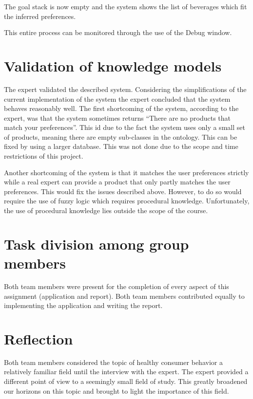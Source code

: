\documentclass[11pt,a4paper]{article}
\begin{document}
The goal stack is now empty and the system shows the list of beverages which fit the inferred preferences.

This entire process can be monitored through the use of the Debug window.

\section{Validation of knowledge models} 

The expert validated the described system. Considering the simplifications of the current implementation of the system the expert concluded that the system behaves reasonably well. The first shortcoming of the system, according to the expert, was that the system sometimes returns ``There are no products that match your preferences''. This id due to the fact the system uses only a small set of products, meaning there are empty sub-classes in the ontology. This can be fixed by using a larger database. This was not done due to the scope and time restrictions of this project.

Another shortcoming of the system is that it matches the user preferences strictly while a real expert can provide a product that only partly matches the user preferences. This would fix the issues described above. However, to do so would require the use of fuzzy logic which requires procedural knowledge. Unfortunately, the use of procedural knowledge lies outside the scope of the course. 

\section{Task division among group members}

Both team members were present for the completion of every aspect of this assignment (application and report). Both team members contributed equally to implementing the application and writing the report.

\section{Reflection}

Both team members considered the topic of healthy consumer behavior a relatively familiar field until the interview with the expert. The expert provided a different point of view to a seemingly small field of study. This greatly broadened our horizons on this topic and brought to light the importance of this field. 
\end{document}
